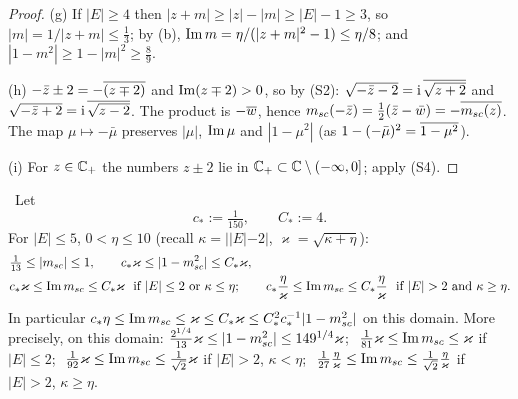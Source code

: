 \begin{proof}
(g) If $|E|\ge4$ then $|z+m|\ge|z|-|m|\ge|E|-1\ge3$, so $|m|=1/|z+m|\le\frac13$; by (b), $\operatorname{Im} m=\eta/(|z+m|^2-1)\le\eta/8$; and $|1-m^2|\ge1-|m|^2\ge\frac89$.

(h) $-\bar z\pm2=-\overline{(z\mp2)}$ and $\operatorname{Im}(z\mp2)>0$, so by (S2): $\sqrt{-\bar z-2}=\mathrm{i}\,\overline{\sqrt{z+2}}$ and $\sqrt{-\bar z+2}=\mathrm{i}\,\overline{\sqrt{z-2}}$. The product is $-\overline{w}$, hence
$m_{sc}(-\bar z)=\frac12(\bar z-\bar w)=-\overline{m_{sc}(z)}$. The map $\mu\mapsto-\bar\mu$ preserves $|\mu|$, $\operatorname{Im}\mu$ and $|1-\mu^2|$ (as $1-(-\bar\mu)^2=\overline{1-\mu^2}$).

(i) For $z\in\mathbb{C}_+$ the numbers $z\pm2$ lie in $\mathbb{C}_+\subset\mathbb{C}\setminus(-\infty,0]$; apply (S4).
\end{proof}

\begin{lemma}\label{lem:mscsize} \infra\
Let
\[
 c_*:=\tfrac1{150},\qquad C_*:=4 .
\]
For $|E|\le5$, $0<\eta\le10$ (recall $\kappa=||E|-2|$, $\varkappa=\sqrt{\kappa+\eta}$):
\begin{align}
 &\tfrac1{13}\le|\msc|\le1,\qquad c_*\varkappa\le|1-\msc^2|\le C_*\varkappa,\label{eq:alpha}\\
 &c_*\varkappa\le\im\msc\le C_*\varkappa\ \ \text{if }|E|\le2\text{ or }\kappa\le\eta;\qquad
 c_*\frac{\eta}{\varkappa}\le\im\msc\le C_*\frac{\eta}{\varkappa}\ \ \text{if }|E|>2\text{ and }\kappa\ge\eta.\label{eq:imm}
\end{align}
In particular $c_*\eta\le\operatorname{Im}m_{sc}\le\varkappa\le C_*\varkappa\le C_*^2c_*^{-1}|1-m_{sc}^2|$ on this domain.
More precisely, on this domain:
$\frac{2^{1/4}}{13}\varkappa\le|1-m_{sc}^2|\le149^{1/4}\varkappa$;
$\ \frac1{81}\varkappa\le\im\msc\le\varkappa$ if $|E|\le2$;
$\ \frac1{92}\varkappa\le\im\msc\le\frac1{\sqrt2}\varkappa$ if $|E|>2$, $\kappa<\eta$;
$\ \frac1{27}\frac\eta\varkappa\le\im\msc\le\frac1{\sqrt2}\frac\eta\varkappa$ if $|E|>2$, $\kappa\ge\eta$.
\end{lemma}
